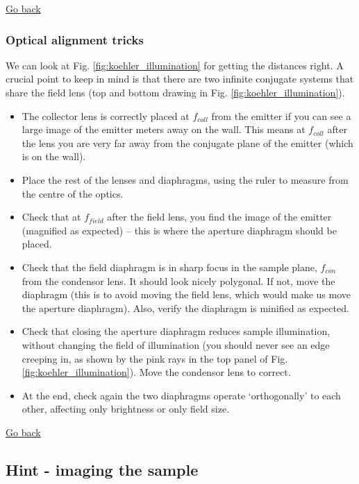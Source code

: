 \documentclass[a4paper]{report}
\begin{document}
   \noindent
   \hyperlink{hintBack-illumination}{Go back}


\subsubsection{Optical alignment tricks}
We can look at Fig. \ref{fig:koehler_illumination} for getting the distances right. A crucial point to keep in mind is that there are two infinite conjugate systems that share the field lens (top and bottom drawing in Fig. \ref{fig:koehler_illumination}).

\begin{itemize}
    \item The collector lens is correctly placed at $f_{coll}$ from the emitter if you can see a large image of the emitter meters away on the wall. This means at $f_{coll}$ after the lens you are very far away from the conjugate plane of the emitter (which is on the wall).
    \item Place the rest of the lenses and diaphragms, using the ruler to measure from the centre of the optics.
    \item Check that at $f_{field}$ after the field lens, you find the image of the emitter (magnified as expected) -- this is where the aperture diaphragm should be placed.
    \item Check that the field diaphragm is in sharp focus in the sample plane, $f_{con}$ from the condensor lens. It should look nicely polygonal. If not, move the diaphragm (this is to avoid moving the field lens, which would make us move the aperture diaphragm). Also, verify the diaphragm is minified as expected.
    \item Check that closing the aperture diaphragm reduces sample illumination, without changing the field of illumination (you should never see an edge creeping in, as shown by the pink rays in the top panel of Fig. \ref{fig:koehler_illumination}). Move the condensor lens to correct.
    \item At the end, check again the two diaphragms operate `orthogonally' to each other, affecting only brightness or only field size.

\end{itemize}

   \noindent
   \hyperlink{hintBack-illumination}{Go back}
   \clearpage

   \subsection{Hint - imaging the sample}
\hypertarget{hintTo-imaging}{}
\end{document}
